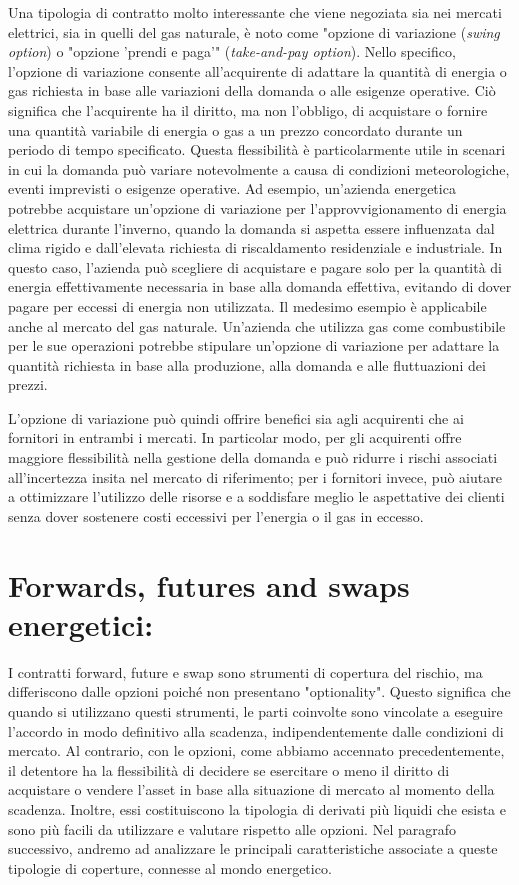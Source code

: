 \documentclass[12pt,a4paper]{report}
\begin{document}
Una tipologia di contratto molto interessante che viene negoziata sia nei mercati elettrici, sia in quelli del gas naturale, è noto come "opzione di variazione (\textit{swing option}) o "opzione 'prendi e paga'" (\textit{take-and-pay option}). Nello specifico, l'opzione di variazione consente all'acquirente di adattare la quantità di energia o gas richiesta in base alle variazioni della domanda o alle esigenze operative. Ciò significa che l'acquirente ha il diritto, ma non l'obbligo, di acquistare o fornire una quantità variabile di energia o gas a un prezzo concordato durante un periodo di tempo specificato. Questa flessibilità è particolarmente utile in scenari in cui la domanda può variare notevolmente a causa di condizioni meteorologiche, eventi imprevisti o esigenze operative. Ad esempio, un'azienda energetica potrebbe acquistare un'opzione di variazione per l'approvvigionamento di energia elettrica durante l'inverno, quando la domanda si aspetta essere influenzata dal clima rigido e dall'elevata richiesta di riscaldamento residenziale e industriale. In questo caso, l'azienda può scegliere di acquistare e pagare solo per la quantità di energia effettivamente necessaria in base alla domanda effettiva, evitando di dover pagare per eccessi di energia non utilizzata.
Il medesimo esempio è applicabile anche al mercato del gas naturale. Un'azienda che utilizza gas come combustibile per le sue operazioni potrebbe stipulare un'opzione di variazione per adattare la quantità richiesta in base alla produzione, alla domanda e alle fluttuazioni dei prezzi.

L'opzione di variazione può quindi offrire benefici sia agli acquirenti che ai fornitori in entrambi i mercati. In particolar modo, per gli acquirenti offre maggiore flessibilità nella gestione della domanda e può ridurre i rischi associati all'incertezza insita nel mercato di riferimento; per i fornitori invece, può aiutare a ottimizzare l'utilizzo delle risorse e a soddisfare meglio le aspettative dei clienti senza dover sostenere costi eccessivi per l'energia o il gas in eccesso.


\section{Forwards, futures and swaps energetici:}


I contratti forward, future e swap sono strumenti di copertura del rischio, ma differiscono dalle opzioni poiché non presentano "optionality". Questo significa che quando si utilizzano questi strumenti, le parti coinvolte sono vincolate a eseguire l'accordo in modo definitivo alla scadenza, indipendentemente dalle condizioni di mercato. Al contrario, con le opzioni, come abbiamo accennato precedentemente, il detentore ha la flessibilità di decidere se esercitare o meno il diritto di acquistare o vendere l'asset in base alla situazione di mercato al momento della scadenza. Inoltre, essi costituiscono la tipologia di derivati più liquidi che esista e sono più facili da utilizzare e valutare rispetto alle opzioni. Nel paragrafo successivo, andremo ad analizzare le principali caratteristiche associate a queste tipologie di coperture, connesse al mondo energetico.
\end{document}

